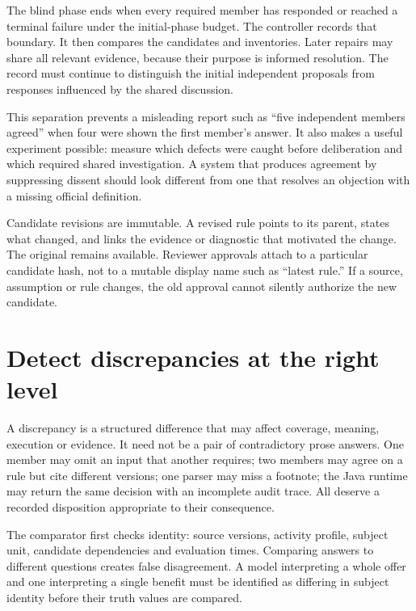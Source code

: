 \documentclass[12pt,a4paper,oneside,openany]{book}
\begin{document}
The blind phase ends when every required member has responded or reached a
terminal failure under the initial-phase budget. The controller records that
boundary. It then compares the candidates and inventories. Later repairs may
share all relevant evidence, because their purpose is informed resolution. The
record must continue to distinguish the initial independent proposals from
responses influenced by the shared discussion.

This separation prevents a misleading report such as ``five independent members
agreed'' when four were shown the first member's answer. It also makes a useful
experiment possible: measure which defects were caught before deliberation and
which required shared investigation. A system that produces agreement by
suppressing dissent should look different from one that resolves an objection
with a missing official definition.

Candidate revisions are immutable. A revised rule points to its parent, states
what changed, and links the evidence or diagnostic that motivated the change.
The original remains available. Reviewer approvals attach to a particular
candidate hash, not to a mutable display name such as ``latest rule.'' If a
source, assumption or rule changes, the old approval cannot silently authorize
the new candidate.

\section{Detect discrepancies at the right level}
\label{merge:M06:05}


A discrepancy is a structured difference that may affect coverage, meaning,
execution or evidence. It need not be a pair of contradictory prose answers.
One member may omit an input that another requires; two members may agree on a
rule but cite different versions; one parser may miss a footnote; the Java
runtime may return the same decision with an incomplete audit trace. All deserve
a recorded disposition appropriate to their consequence.

The comparator first checks identity: source versions, activity profile, subject
unit, candidate dependencies and evaluation times. Comparing answers to different
questions creates false disagreement. A model interpreting a whole offer and one
interpreting a single benefit must be identified as differing in subject identity
before their truth values are compared.
\end{document}
